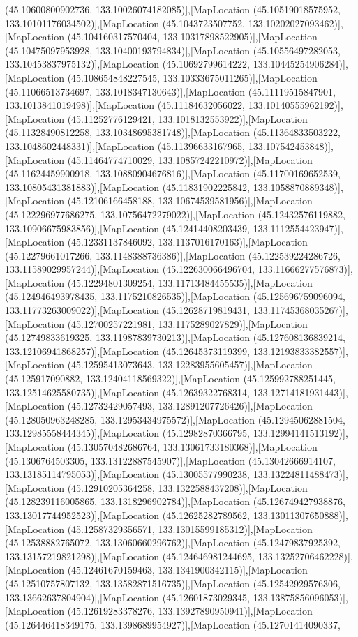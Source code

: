 (45.10600800902736, 133.10026074182085)],[MapLocation (45.10519018575952, 133.10101176034502)],[MapLocation (45.1043723507752, 133.10202027093462)],[MapLocation (45.104160317570404, 133.10317898522905)],[MapLocation (45.10475097953928, 133.10400193794834)],[MapLocation (45.10556497282053, 133.10453837975132)],[MapLocation (45.10692799614222, 133.10445254906284)],[MapLocation (45.108654848227545, 133.10333675011265)],[MapLocation (45.11066513734697, 133.1018347130643)],[MapLocation (45.11119515847901, 133.1013841019498)],[MapLocation (45.11184632056022, 133.10140555962192)],[MapLocation (45.11252776129421, 133.1018132553922)],[MapLocation (45.11328490812258, 133.10348695381748)],[MapLocation (45.11364833503222, 133.1048602448331)],[MapLocation (45.11396633167965, 133.107542453848)],[MapLocation (45.11464774710029, 133.10857242210972)],[MapLocation (45.11624459900918, 133.10880904676816)],[MapLocation (45.11700169652539, 133.10805431381883)],[MapLocation (45.11831902225842, 133.1058870889348)],[MapLocation (45.12106166458188, 133.10674539581956)],[MapLocation (45.122296977686275, 133.10756472279022)],[MapLocation (45.12432576119882, 133.10906675983856)],[MapLocation (45.12414408203439, 133.1112554423947)],[MapLocation (45.12331137846092, 133.1137016170163)],[MapLocation (45.12279661017266, 133.1148388736386)],[MapLocation (45.122539224286726, 133.11589029957244)],[MapLocation (45.122630066496704, 133.11666277576873)],[MapLocation (45.12294801309254, 133.11713484455535)],[MapLocation (45.124946493978435, 133.1175210826535)],[MapLocation (45.125696759096094, 133.11773263009022)],[MapLocation (45.12628719819431, 133.11745368035267)],[MapLocation (45.12700257221981, 133.1175289027829)],[MapLocation (45.12749833619325, 133.11987839730213)],[MapLocation (45.127608136839214, 133.12106941868257)],[MapLocation (45.12645373119399, 133.12193833382557)],[MapLocation (45.12595413073643, 133.12283955605457)],[MapLocation (45.125917090882, 133.12404118569322)],[MapLocation (45.125992788251445, 133.12514625580735)],[MapLocation (45.12639322768314, 133.12714181931443)],[MapLocation (45.12732429057493, 133.12891207726426)],[MapLocation (45.128050963248285, 133.12953434975572)],[MapLocation (45.12945062881504, 133.12985558444345)],[MapLocation (45.12982870366795, 133.12994141513192)],[MapLocation (45.130570482686764, 133.13061733180368)],[MapLocation (45.1306764503305, 133.13122887545907)],[MapLocation (45.13042666914107, 133.13185114795053)],[MapLocation (45.13005577990238, 133.13224811488473)],[MapLocation (45.12910205364258, 133.1322588437208)],[MapLocation (45.128239116005865, 133.1318296902784)],[MapLocation (45.126749427938876, 133.13017744952523)],[MapLocation (45.12625282789562, 133.13011307650888)],[MapLocation (45.12587329356571, 133.13015599185312)],[MapLocation (45.12538882765072, 133.13060660296762)],[MapLocation (45.12479837925392, 133.13157219821298)],[MapLocation (45.124646981244695, 133.13252706462228)],[MapLocation (45.12461670159463, 133.1341900342115)],[MapLocation (45.12510757807132, 133.13582871516735)],[MapLocation (45.12542929576306, 133.13662637804904)],[MapLocation (45.12601873029345, 133.13875856096053)],[MapLocation (45.12619283378276, 133.13927890950941)],[MapLocation (45.126446418349175, 133.1398689954927)],[MapLocation (45.12701414090337, 